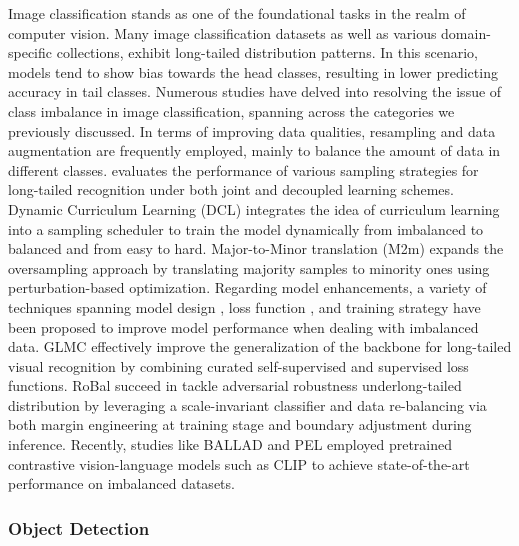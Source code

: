 Image classification stands as one of the foundational tasks in the realm of computer vision. Many image classification datasets as well as various domain-specific collections, exhibit long-tailed distribution patterns. In this scenario, models tend to show bias towards the head classes, resulting in lower predicting accuracy in tail classes. Numerous studies have delved into resolving the issue of class imbalance in image classification, spanning across the categories we previously discussed. In terms of improving data qualities, resampling \cite{kang2019decoupling, ren2020balanced, wang2019dynamic} and data augmentation \cite{kim2020m2m, tan2021equalization, chu2020feature} are frequently employed, mainly to balance the amount of data in different classes. \cite{kang2019decoupling} evaluates the performance of various sampling strategies for long-tailed recognition under both joint and decoupled learning schemes. Dynamic Curriculum Learning (DCL) \cite{wang2019dynamic} integrates the idea of curriculum learning into a sampling scheduler to train the model dynamically from imbalanced to balanced and from easy to hard. Major-to-Minor translation (M2m)  \cite{kim2020m2m} expands the oversampling approach by translating majority samples to minority ones using perturbation-based optimization. Regarding model enhancements, a variety of techniques spanning model design \cite{wu2020solving, wu2021adversarial}, loss function \cite{huang2016learning, dong2017class, zhang2017range}, and training strategy \cite{kang2021exploring, kang2019decoupling, chu2020feature} have been proposed to improve model performance when dealing with imbalanced data. GLMC \cite{du2023global} effectively improve the generalization of the backbone for long-tailed visual recognition by combining curated self-supervised and supervised loss functions.  RoBal \cite{wu2021adversarial} succeed in tackle adversarial robustness underlong-tailed distribution by leveraging a scale-invariant classifier and data re-balancing via both margin engineering at training stage and boundary adjustment during inference.
Recently, studies like BALLAD \cite{ma2021simple} and PEL \cite{shi2023parameter} employed pretrained contrastive vision-language models such as CLIP to achieve state-of-the-art performance on imbalanced datasets.

\subsubsection{Object Detection}\ 

